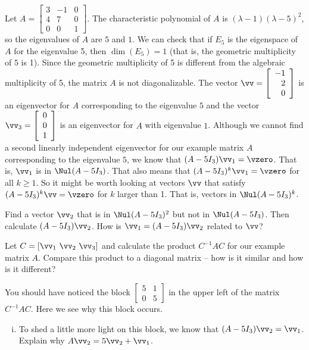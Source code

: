  \label{sec:JCF}

\begin{pa} \label{pa:JCF}  Let $A = \left[ \begin{array}{crc} 3 &-1 & 0  \\ 4 & 7 & 0 \\ 0&0&1 \end{array} \right]$. The characteristic polynomial of $A$ is $(\lambda-1)(\lambda - 5)^2$, so the eigenvalues of $A$ are $5$ and $1$. We can check that if $E_5$ is the eigenspace of $A$ for the eigenvalue 5, then $\dim(E_5) = 1$ (that is, the geometric multiplicity of $5$ is 1). Since the geometric multiplicity of 5 is different from the algebraic multiplicity of 5, the matrix $A$ is not diagonalizable. The vector $\vv = \left[ \begin{array}{r} -1\\2\\0 \end{array}\right]$ is an eigenvector for $A$ corresponding to the eigenvalue $5$ and the vector $\vv_3 = \left[ \begin{array}{c} 0 \\ 0 \\ 1 \end{array}\right]$ is an eigenvector for $A$ with eigenvalue $1$. Although we cannot find a second linearly independent eigenvector for our example matrix $A$ corresponding to the eigenvalue $5$, we know that $(A - 5I_3) \vv_1 = \vzero$. That is, $\vv_1$ is in $\Nul (A - 5I_3)$. That also means that $(A - 5I_3)^k \vv_1 = \vzero$ for all $k \geq 1$. So it might be worth looking at vectors $\vv$ that satisfy $(A-5I_3)^k\vv = \vzero$ for $k$ larger than 1. That is, vectors in $\Nul (A - 5I_3)^k$.  
\ba
\item Find a vector $\vv_2$ that is in $\Nul (A-5I_3)^2$ but not in $\Nul (A-5I_3)$. Then calculate $(A-5I_3)\vv_2$. How is $\vv_1 = (A-5I_3)\vv_2$ related to $\vv$? 

\item  Let $C = [\vv_1 \ \vv_2 \ \vv_3]$ and calculate the product $C^{-1}AC$ for our example matrix $A$. Compare this product to a diagonal matrix -- how is it similar and how is it different?

\item You should have noticed the block $\left[ \begin{array}{cc} 5&1 \\ 0&5 \end{array} \right]$ in the upper left of the matrix $C^{-1}AC$. Here we see why this block occurs. 
	\begin{enumerate}[i.]
	\item To shed a little more light on this block, we know that $(A - 5 I_3) \vv_2 = \vv_1$. Explain why $A \vv_2 =  5 \vv_2 + \vv_1$. 


\end{enumerate}
\end{pa}
